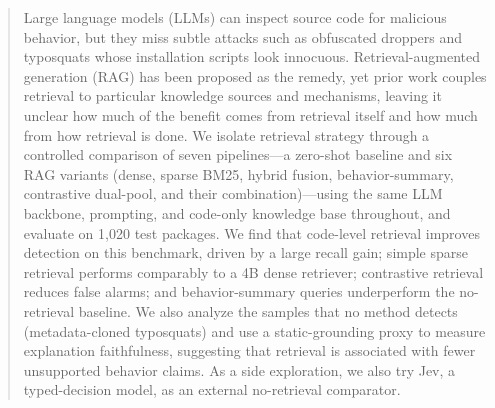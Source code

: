 \begin{abstract}
Large language models (LLMs) can inspect source code for malicious behavior,
but they miss subtle attacks such as obfuscated droppers and typosquats whose
installation scripts look innocuous. Retrieval-augmented generation (RAG)
has been proposed as the remedy, yet prior work couples retrieval to
particular knowledge sources and mechanisms, leaving it unclear how much of
the benefit comes from retrieval itself and how much from how retrieval is
done. We isolate retrieval strategy through a controlled comparison of seven
pipelines---a zero-shot baseline and six RAG variants (dense, sparse BM25,
hybrid fusion, behavior-summary, contrastive dual-pool, and their
combination)---using the same LLM backbone, prompting, and code-only
knowledge base throughout, and evaluate on 1{,}020 test packages. We find
that code-level retrieval improves detection on this benchmark, driven by a
large recall gain; simple sparse retrieval performs comparably to a 4B dense
retriever; contrastive retrieval reduces false alarms; and behavior-summary
queries underperform the no-retrieval baseline. We also analyze the samples
that no method detects (metadata-cloned typosquats) and use a static-grounding
proxy to measure explanation faithfulness, suggesting that retrieval is
associated with fewer unsupported behavior claims. As a side exploration, we also try Jev, a typed-decision
model, as an external no-retrieval comparator.
\end{abstract}
\endinput
